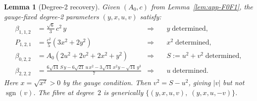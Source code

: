 \documentclass{article}
\newtheorem{lemma}[theorem]{Lemma}
\theoremstyle{definition}
\theoremstyle{remark}
\DeclareMathOperator{\sgn}{sgn}
\theoremstyle{definition}
\begin{document}
\begin{lemma}[Degree-2 recovery]\label{lem:app-ell2}
Given $(A_0, c)$ from Lemma~\ref{lem:app-F0F1}, the gauge-fixed degree-2
parameters $(y, x, u, v)$ satisfy:
\begin{align}
  \beta_{1,1,2} &= \tfrac{\sqrt{6}}{3}\, c^2\, y
    &\Longrightarrow\quad& y \;\text{determined}, \label{eq:app-y}\\
  P_{1,2,1} &= \tfrac{c^2}{5}(3x^2 + 2y^2)
    &\Longrightarrow\quad& x^2 \;\text{determined}, \label{eq:app-x2}\\
  \beta_{0,2,2} &= A_0(2u^2 + 2v^2 + 2x^2 + y^2)
    &\Longrightarrow\quad& S := u^2+v^2 \;\text{determined}, \label{eq:app-S}\\
  \beta_{2,2,2} &= \tfrac{6\sqrt{14}\,S\,y - 6\sqrt{21}\,u\,x^2
    - 3\sqrt{14}\,x^2 y - \sqrt{14}\,y^3}{7}
    &\Longrightarrow\quad& u \;\text{determined}. \label{eq:app-u}
\end{align}
Here $x = \sqrt{x^2} > 0$ by the gauge condition.
Then $v^2 = S - u^2$, giving $|v|$ but not $\sgn(v)$.
The fibre at degree~$2$ is generically $\{(y,x,u,v),\; (y,x,u,-v)\}$.
\end{lemma}
\end{document}

